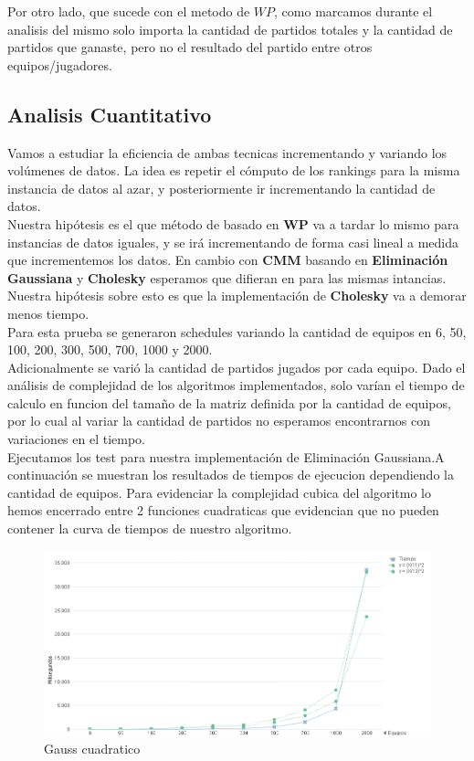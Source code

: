 Por otro lado, que sucede con el metodo de $WP$, como marcamos durante el analisis del mismo solo importa la cantidad de partidos totales y la cantidad de partidos que ganaste, pero no el resultado del partido entre otros equipos/jugadores.

\subsection{Analisis Cuantitativo}


Vamos a estudiar la eficiencia de ambas tecnicas incrementando y variando los volúmenes de datos. La idea es repetir el cómputo de los rankings para la misma instancia de datos al azar, 
y posteriormente ir incrementando la cantidad de datos. \\

Nuestra hipótesis es el que método de basado en \textbf{WP} va a tardar lo mismo para instancias de datos iguales, y se irá incrementando de forma casi lineal a medida que 
incrementemos los datos. En cambio con \textbf{CMM} basando en \textbf{Eliminación Gaussiana} y \textbf{Cholesky} esperamos que difieran en para las mismas intancias. 
Nuestra hipótesis sobre esto es que la implementación de \textbf{Cholesky} va a demorar menos tiempo. \\

Para esta prueba se generaron schedules variando la cantidad de equipos en 6, 50, 100, 200, 300, 500, 700, 1000 y 2000. \\

Adicionalmente se varió la cantidad de partidos jugados por cada equipo. Dado el análisis de complejidad de los algoritmos implementados, solo varían el tiempo de calculo en 
funcion del tamaño de la matriz definida por la cantidad de equipos, por lo cual al variar la cantidad de partidos no esperamos encontrarnos con variaciones en el tiempo. \\

Ejecutamos los test para nuestra implementación de Eliminación Gaussiana.A continuación se muestran los resultados de tiempos de ejecucion dependiendo la cantidad de equipos.
Para evidenciar la complejidad cubica del algoritmo lo hemos encerrado entre 2 funciones cuadraticas que evidencian que no pueden contener la curva de tiempos de nuestro algoritmo. \\


\begin{figure}[H]
\centering
\includegraphics[width=1\textwidth]{IMG/gauss cuadrativo.png}
\caption{Gauss cuadratico}
\label{fig:Gauss cuadratico}
\end{figure}

